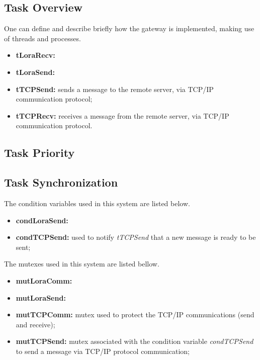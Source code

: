 \subsection{Task Overview}
One can define and describe briefly how the gateway is implemented, making use of threads and processes.

\begin{itemize}
	\item \textbf{tLoraRecv:}
	\item \textbf{tLoraSend:}
	\item \textbf{tTCPSend:} sends a message to the remote server, via TCP/IP communication protocol;
	\item \textbf{tTCPRecv:} receives a message from the remote server, via TCP/IP communication protocol.
\end{itemize}

\subsection{Task Priority}

\subsection{Task Synchronization}

The condition variables used in this system are listed below.

\begin{itemize}
	\item \textbf{condLoraSend:}
	
	\item \textbf{condTCPSend:} used to notify \textit{tTCPSend} that a new message is ready to be sent;
		
\end{itemize}

The mutexes used in this system are listed bellow.

\begin{itemize}
	\item \textbf{mutLoraComm:}
	\item \textbf{mutLoraSend:}	
	
	\item \textbf{mutTCPComm:} mutex used to protect the TCP/IP communications (send and receive);
	\item \textbf{mutTCPSend:} mutex associated with the condition variable \textit{condTCPSend} to send a message via TCP/IP protocol communication;
\end{itemize}


